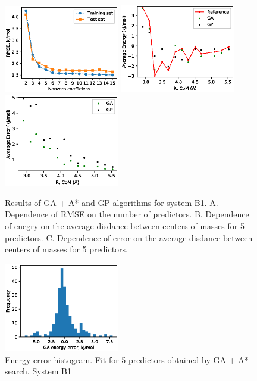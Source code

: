 \documentclass[aps,prl,reprint,amsmath,amssymb,nature]{revtex4-1}
\begin{document}
\begin{figure}
\includegraphics[width=0.45\textwidth]{media/B1_Single_GA_PATH_RMSE.eps}
\includegraphics[width=0.45\textwidth]{media/B1_Single_Energy_5_predictors.eps}
\includegraphics[width=0.45\textwidth]{media/B1_Single_Error_5_predictors.eps}
\caption{Results of GA + A* and GP algorithms for system B1.  A. Dependence of RMSE on the number of predictors. B. Dependence of enegry on the average disdance between centers of masses for 5 predictors. C. Dependence of error on the average disdance between centers of masses for 5 predictors.}\label{Fig:B1}
\end{figure}

\begin{figure}
\includegraphics[width=0.45\textwidth]{media/B1_GA_energy_error_histogram_5_predictors.eps}
\caption{Energy error histogram. Fit for 5 predictors obtained by GA + A* search. System B1}\label{Fig:B1_histogram_5_predictors}
\end{figure}
\end{document}
